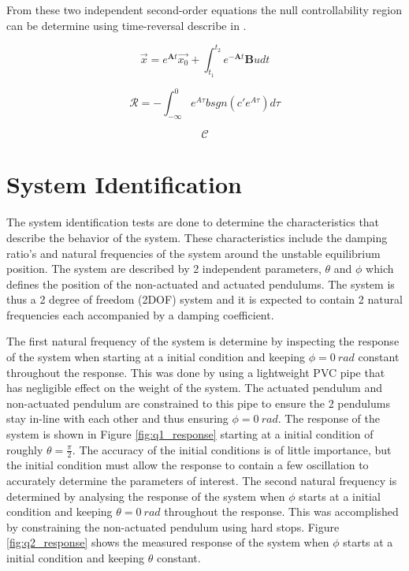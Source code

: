 \documentclass[a4paper,12pt]{article}
\begin{document}
	From these two independent second-order equations the null controllability region can be determine using time-reversal describe in \cite{null_controllability}.
	
	$$ \vec{x} = e^{\boldsymbol{A}t}\vec{x_{0}} + \int_{t_{1}}^{t_{2}} e^{-\boldsymbol{A}t}\boldsymbol{B}u dt $$ 
	
	$$\mathcal{R} = {-\int_{-\infty}^{0} e^{A\tau}bsgn(c'e^{A\tau})d\tau }  $$
	
	$$\mathcal{C} $$ 
	
	
	\section{System Identification}
	
	
	The system identification tests are done to determine the characteristics that describe the behavior of the system. These characteristics include the damping ratio's and natural frequencies of the system around the unstable equilibrium position. The system are described by 2 independent parameters, $\theta$ and $\phi$ which defines the position of the non-actuated and actuated pendulums. The system is thus a 2 degree of freedom (2DOF) system and it is expected to contain 2 natural frequencies each accompanied by a damping coefficient.
	
	The first natural frequency of the system is determine by inspecting the response of the system when starting at a initial condition and keeping $\phi = \SI{0}{rad}$ constant throughout the response. This was done by using a lightweight PVC pipe that has negligible effect on the weight of the system. The actuated pendulum and non-actuated pendulum are constrained to this pipe to ensure the 2 pendulums stay in-line with each other and thus ensuring $\phi = \SI{0}{rad}$. The response of the system is shown in Figure \ref{fig:q1_response} starting at a initial condition of roughly $\theta = \frac{\pi}{2}$. The accuracy of the initial conditions is of little importance, but the initial condition must allow the response to contain a few oscillation to accurately determine the parameters of interest. The second natural frequency is determined by analysing the response of the system when $\phi$ starts at a initial condition and keeping $\theta = \SI{0}{rad}$ throughout the response. This was accomplished by constraining the non-actuated pendulum using hard stops. Figure \ref{fig:q2_response} shows the measured response of the system when $\phi$ starts at a initial condition and keeping $\theta$ constant.%
	
\end{document}
